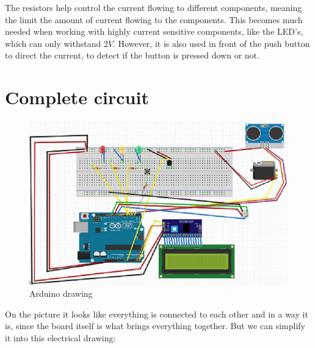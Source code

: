 The resistors help control the current flowing to different components, meaning the limit the amount of current flowing to the components. This becomes much needed when working with highly current sensitive components, like the LED's, which can only withstand $2 V$. However, it is also used in front of the push button to direct the current, to detect if the button is pressed down or not.

\section{Complete circuit}

\begin{figure} [h!]
\centering
  \includegraphics [width=\linewidth]{fig/Arduinoboard}
  \caption{Arduino drawing}
  \label{fig:Arduinoboard}
\end{figure}

On the picture it looks like everything is connected to each other and in a way it is, since the board itself is what brings everything together. But we can simplify it into this electrical drawing: 

\newpage


